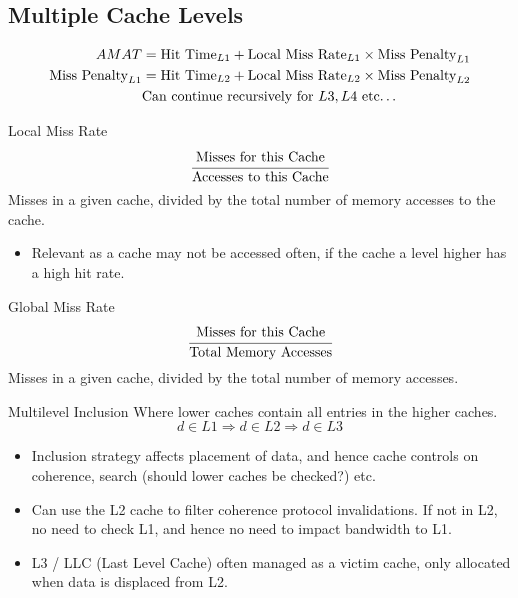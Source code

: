 \subsection{Multiple Cache Levels}
\[\begin{split}
    AMAT & = \text{Hit Time}_{L1} + \text{Local Miss Rate}_{L1} \times \text{Miss Penalty}_{L1} \\
    \text{Miss Penalty}_{L1} & = \text{Hit Time}_{L2} + \text{Local Miss Rate}_{L2} \times \text{Miss Penalty}_{L2} \\
    & \text{Can continue recursively for }L3, L4 \text{ etc\dots} \\
\end{split}\]
\begin{tcbraster}[raster columns=2, raster equal height]
    \begin{definitionbox}{Local Miss Rate}
        \[\cfrac{\text{Misses for this Cache}}{\text{Accesses to this Cache}}\]
        Misses in a given cache, divided by the total number of memory accesses to the cache.
        \begin{itemize}
            \item Relevant as a cache may not be accessed often, if the cache a level higher has a high hit rate.
        \end{itemize}
    \end{definitionbox}
    \begin{definitionbox}{Global Miss Rate}
        \[\cfrac{\text{Misses for this Cache}}{\text{Total Memory Accesses}}\]
        Misses in a given cache, divided by the total number of memory accesses.
    \end{definitionbox}
\end{tcbraster}

\begin{definitionbox}{Multilevel Inclusion}
    Where lower caches contain all entries in the higher caches.
    \[d \in L1 \Rightarrow d \in L2 \Rightarrow d \in L3\]
\end{definitionbox}
\begin{itemize}
    \item Inclusion strategy affects placement of data, and hence cache controls on coherence, search (should lower caches be checked?) etc.
    \item Can use the L2 cache to filter coherence protocol invalidations. If not in L2, no need to check L1, and hence no need to impact bandwidth to L1.
    \item L3 / LLC (Last Level Cache) often managed as a victim cache, only allocated when data is displaced from L2.
\end{itemize}

